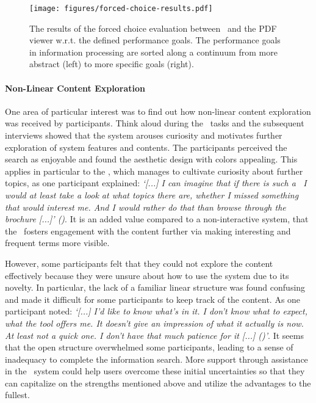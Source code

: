 \begin{figure}[ht!]
    \centering
    \texttt{[image: figures/forced-choice-results.pdf]}
    \caption{
    The results of the forced choice evaluation between \apluschis\ and the PDF viewer w.r.t. the defined performance goals.
    The performance goals in information processing are sorted along a continuum from more abstract (left) to more specific goals (right). 
    }
    \label{fig:Forced Choice}
\end{figure}



\paragraph*{Non-Linear Content Exploration} 
One area of particular interest was to find out how non-linear content exploration was received by participants. 
%
Think aloud during the \cwt\ tasks and the subsequent interviews showed that the system arouses curiosity and motivates further exploration of system features and contents. 
%
The participants perceived the search as enjoyable and found the aesthetic design with colors appealing. 
%
This applies in particular to the \WordCloud, which manages to cultivate curiosity about further topics, as one participant explained: \emph{‘[...] I can imagine that if there is such a \WordCloud\, I would at least take a look at what topics there are, whether I missed something that would interest me. And I would rather do that than browse through the brochure [...]’ (\PTen)}. 
%
It is an added value compared to a non-interactive system, that the \WordCloud\ fosters engagement with the content further via making interesting and frequent terms more visible. 



However, some participants felt that they could not explore the content effectively because they were unsure about how to use the system due to its novelty. 
%
In particular, the lack of a familiar linear structure was found confusing and made it difficult for some participants to keep track of the content. 
%
As one participant noted: \emph{‘[...] I’d like to know what’s in it. 
%
I don’t know what to expect, what the tool offers me.
%
It doesn't give an impression of what it actually is now. 
%
At least not a quick one. 
%
I don’t have that much patience for it [...] (\PSeven)’}. 
%
It seems that the open structure overwhelmed some participants, leading to a sense of inadequacy to complete the information search. 
%
More support through assistance in the \apluschis\ system could help users overcome these initial uncertainties so that they can capitalize on the strengths mentioned above and utilize the advantages to the fullest.



